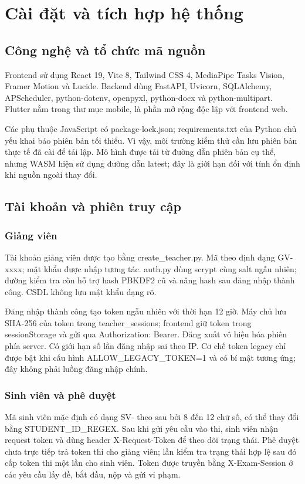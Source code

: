 \chapter{Cài đặt và tích hợp hệ thống}
\section{Công nghệ và tổ chức mã nguồn}
Frontend sử dụng React 19, Vite 8, Tailwind CSS 4, MediaPipe Tasks Vision, Framer Motion và Lucide. Backend dùng FastAPI, Uvicorn, SQLAlchemy, APScheduler, python-dotenv, openpyxl, python-docx và python-multipart. Flutter nằm trong thư mục mobile, là phần mở rộng độc lập với frontend web.

Các phụ thuộc JavaScript có package-lock.json; requirements.txt của Python chủ yếu khai báo phiên bản tối thiểu. Vì vậy, môi trường kiểm thử cần lưu phiên bản thực tế đã cài để tái lập. Mô hình được tải từ đường dẫn phiên bản cụ thể, nhưng WASM hiện sử dụng đường dẫn latest; đây là giới hạn đối với tính ổn định khi nguồn ngoài thay đổi.

\section{Tài khoản và phiên truy cập}
\subsection{Giảng viên}
Tài khoản giảng viên được tạo bằng create\_teacher.py. Mã theo định dạng GV-xxxx; mật khẩu được nhập tương tác. auth.py dùng scrypt cùng salt ngẫu nhiên; đường kiểm tra còn hỗ trợ hash PBKDF2 cũ và nâng hash sau đăng nhập thành công. CSDL không lưu mật khẩu dạng rõ.

Đăng nhập thành công tạo token ngẫu nhiên với thời hạn 12 giờ. Máy chủ lưu SHA-256 của token trong teacher\_sessions; frontend giữ token trong sessionStorage và gửi qua Authorization: Bearer. Đăng xuất vô hiệu hóa phiên phía server. Có giới hạn số lần đăng nhập sai theo IP. Cơ chế token legacy chỉ được bật khi cấu hình ALLOW\_LEGACY\_TOKEN=1 và có bí mật tương ứng; đây không phải luồng đăng nhập chính.

\subsection{Sinh viên và phê duyệt}
Mã sinh viên mặc định có dạng SV- theo sau bởi 8 đến 12 chữ số, có thể thay đổi bằng STUDENT\_ID\_REGEX. Sau khi gửi yêu cầu vào thi, sinh viên nhận request token và dùng header X-Request-Token để theo dõi trạng thái. Phê duyệt chưa trực tiếp trả token thi cho giảng viên; lần kiểm tra trạng thái hợp lệ sau đó cấp token thi một lần cho sinh viên. Token được truyền bằng X-Exam-Session ở các yêu cầu lấy đề, bắt đầu, nộp và gửi vi phạm.

